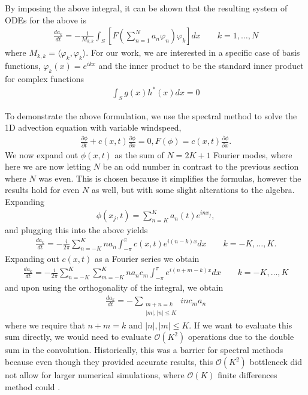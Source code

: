 By imposing the above integral, it can be shown\cite{durran} that the resulting system of ODEs for the above is
\begin{align}
\frac{d a_{k}}{dt} = -\frac{1}{M_{k,k}}\int_{S}\left[F\left(\sum_{n=1}^{N}a_{n}\varphi_{n}\right)\varphi_{k}\right]dx \qquad k=1,\ldots,N
\end{align}
where $M_{k,k}=\langle \varphi_{k},\varphi_{k}\rangle$. For our work, we are interested in a specific case of basis functions, $\varphi_{k}(x)=e^{ikx}$ and the inner product to be the standard inner product for complex functions
\begin{align}
\int_{S}g(x)h^{*}(x)dx=0 
\end{align}

To demonstrate the above formulation, we use the spectral method to solve the 1D advection equation with variable windspeed,
\begin{align}
\frac{\partial\phi}{\partial t} + c(x,t)\frac{\partial \phi}{\partial x} =0, F(\phi) = c(x,t)\frac{\partial \phi}{\partial x}.
\end{align}
We now expand out $\phi(x,t)$ as the sum of $N=2K+1$ Fourier modes, where here we are now letting $N$ be an odd number in contrast to the previous section where $N$ was even. This is chosen because it simplifies the formulas, however the results hold for even $N$ as well, but with some slight alterations to the algebra. Expanding
\begin{align}
\phi(x_{j},t)= \sum_{n=K}^{K}a_{n}(t)e^{inx_{j}},
\end{align}
and plugging this into the above yields
\begin{align}
\frac{d a_{k}}{dt} = -\frac{i}{2\pi}\sum_{n=-K}^{K}na_{n}\int_{-\pi}^{\pi}c(x,t)e^{i(n-k)x}dx \qquad k=-K,\ldots,K.
\end{align}
Expanding out $c(x,t)$ as a Fourier series we obtain
\begin{align} 
\frac{d a_{k}}{dt} = -\frac{i}{2\pi}\sum_{n=-K}^{K}\sum_{m=-K}^{K}na_{n}c_{m}\int_{-\pi}^{\pi}e^{i(n+m-k)x}dx \qquad k=-K,\ldots,K
\end{align}
and upon using the orthogonality of the integral, we obtain
\begin{align}
\frac{da_{k}}{dt} = -\sum_{\substack{m+n=k\\ |m|,|n|\le K}} inc_{m}a_{n}
\end{align}
where we require that $n+m=k$ and $|n|,|m|\le K$. If we want to evaluate this sum directly, we would need to evaluate $\mathcal{O}(K^{2})$ operations due to the double sum in the convolution. Historically, this was a barrier for spectral methods because even though they provided accurate results, this $\mathcal{O}(K^{2})$ bottleneck did not allow for larger numerical simulations, where $\mathcal{O}(K)$ finite differences method could \cite{durran}.

